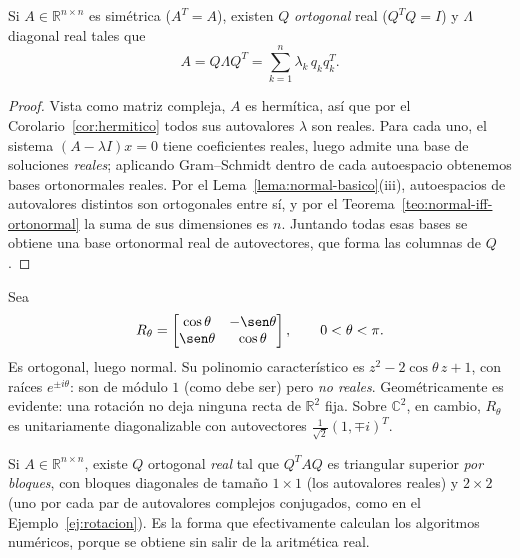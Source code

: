 \begin{theorem}\label{teo:espectral-real}   %
Si $A\in\mathbb{R}^{n\times n}$ es simétrica ($A^{T}=A$), existen $Q$ \emph{ortogonal}
real ($Q^{T}Q=I$) y $\Lambda$ diagonal real tales que
\[
A=Q\Lambda Q^{T}=\sum_{k=1}^{n}\lambda_k\,q_kq_k^{T}.
\]
\end{theorem}

\begin{proof}
Vista como matriz compleja, $A$ es hermítica, así que por el
Corolario~\ref{cor:hermitico} todos sus autovalores $\lambda$ son reales.
Para cada uno, el sistema $(A-\lambda I)x=0$ tiene coeficientes reales, luego admite
una base de soluciones \emph{reales}; aplicando Gram--Schmidt dentro de cada autoespacio
obtenemos bases ortonormales reales. Por el Lema~\ref{lema:normal-basico}(iii),
autoespacios de autovalores distintos son ortogonales entre sí, y por el
Teorema~\ref{teo:normal-iff-ortonormal} la suma de sus dimensiones es $n$.
Juntando todas esas bases se obtiene una base ortonormal real de autovectores,
que forma las columnas de $Q$.
\end{proof}

\begin{example}\label{ej:rotacion}  %
Sea
\[
R_\theta=\begin{bmatrix}\cos\theta & -\sen\theta\\ \sen\theta & \cos\theta\end{bmatrix},
\qquad 0<\theta<\pi .
\]
Es ortogonal, luego normal. Su polinomio característico es $z^{2}-2\cos\theta\,z+1$,
con raíces $e^{\pm i\theta}$: son de módulo $1$ (como debe ser) pero \emph{no reales}.
Geométricamente es evidente: una rotación no deja ninguna recta de $\mathbb{R}^{2}$ fija.
Sobre $\mathbb{C}^{2}$, en cambio, $R_\theta$ es unitariamente diagonalizable con
autovectores $\tfrac1{\sqrt2}(1,\mp i)^{T}$.
\end{example}

\begin{theorem}\label{teo:schur-real}
Si $A\in\mathbb{R}^{n\times n}$, existe $Q$ ortogonal \emph{real} tal que $Q^{T}AQ$ es
triangular superior \emph{por bloques}, con bloques diagonales de tamaño $1\times1$ (los
autovalores reales) y $2\times2$ (uno por cada par de autovalores complejos conjugados,
como en el Ejemplo~\ref{ej:rotacion}). Es la forma que efectivamente calculan los
algoritmos numéricos, porque se obtiene sin salir de la aritmética real.
\end{theorem}

